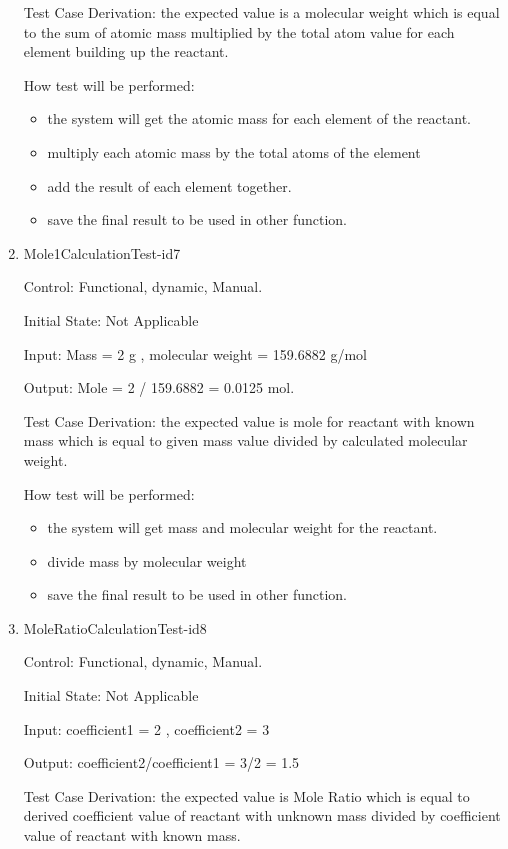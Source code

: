 \documentclass[12pt, titlepage]{article}
\begin{document}
\begin{enumerate}
Test Case Derivation: the expected value is a molecular weight which is equal to the sum of  atomic mass multiplied by the total atom value for each element building up the reactant. 
					
How test will be performed: 
\begin{itemize}
\item the system will get the atomic mass for each element of the reactant.
\item multiply each atomic mass by the total atoms of the element 
\item add the result of each element together.
\item save the final result to be used in other function.
\end{itemize}

\item{Mole1CalculationTest-id7\\}

Control: Functional, dynamic, Manual.
					
Initial State: Not Applicable
					
Input: Mass = 2 g , molecular weight = 159.6882 g/mol
			
Output:  Mole = 2 / 159.6882 =  0.0125 mol. 

Test Case Derivation: the expected value is mole for reactant with known mass which is equal to given mass value divided by calculated molecular weight. 	
				
How test will be performed: 
\begin{itemize}
\item the system will get mass and molecular weight  for the reactant.
\item divide mass by molecular weight 
\item save the final result to be used in other function.
\end{itemize}

\item{MoleRatioCalculationTest-id8\\}

Control: Functional, dynamic, Manual.
					
Initial State: Not Applicable
					
Input: coefficient1 = 2  , coefficient2 = 3
			
Output:  coefficient2/coefficient1 = 3/2 = 1.5 

Test Case Derivation: the expected value is Mole Ratio which is equal to derived coefficient value of reactant with unknown mass divided by coefficient value of reactant with known mass.
 					

\end{enumerate}
\end{document}
